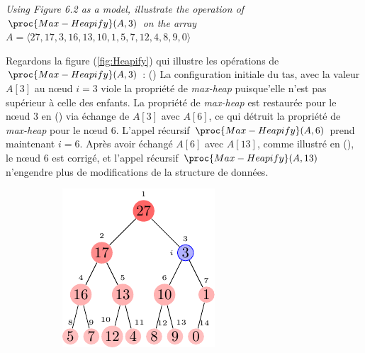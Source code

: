 \begin{description}
   \textit{Using Figure 6.2 as a model, illustrate the operation of $\proc{Max-Heapify}(A,3)$ on the array $A = \langle 27, 17, 3, 16, 13, 10, 1, 5, 7, 12, 4, 8, 9, 0 \rangle$}
    \begin{ex}

      Regardons la figure (\ref{fig:Heapify}) qui illustre les op\'erations de $\proc{Max-Heapify}(A,3)$ : () La configuration initiale du tas, avec la valeur $A[3]$ au n\oe ud $i = 3$ viole la propri\'et\'e de \textit{max-heap} puisque'elle n'est pas sup\'erieur \`a celle des enfants. La propri\'et\'e de \textit{max-heap} est restaur\'ee pour le n\oe ud $3$ en () via \'echange de $A[3]$ avec $A[6]$, ce qui d\'etruit la propri\'et\'e de \textit{max-heap} pour le n\oe ud $6$. L'appel r\'ecursif $\proc{Max-Heapify}(A,6)$ prend maintenant $i=6$. Apr\`es  avoir \'echang\'e $A[6]$ avec $A[13]$, comme illustr\'e en (), le n\oe ud $6$ est corrig\'e, et l'appel r\'ecursif $\proc{Max-Heapify}(A,13)$ n'engendre plus de modifications de la structure de donn\'ees.

      \begin{figure}[H]
        \centering
        \begin{subfigure}[t]{.45\textwidth}
          \centering
          \includegraphics[scale=1.4]{img/6_2-1/6_2-1_1}
          \caption{}\label{fig:6_2-1_1}
        \end{subfigure}


\end{figure}
\end{ex}
\end{description}
